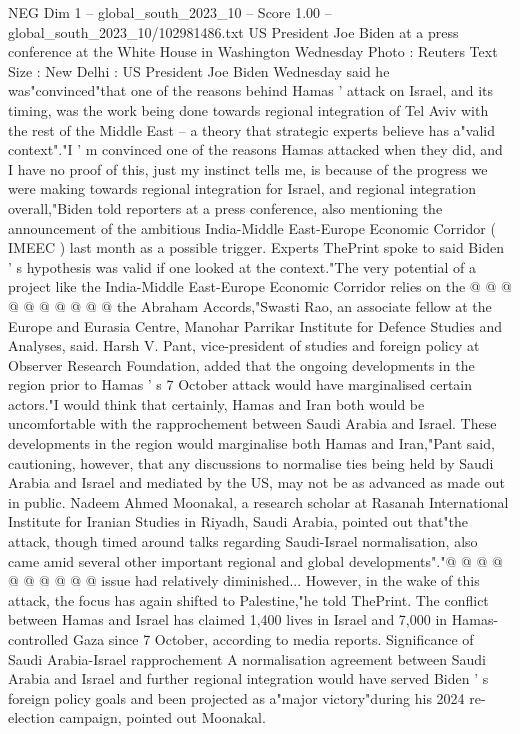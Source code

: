 \begin{textsample}{NEG Dim 1 – global\_south\_2023\_10 – Score 1.00 – global\_south\_2023\_10/102981486.txt}  \label{ex:f1_neg_261}
US President Joe Biden at a press conference at the White House in Washington Wednesday Photo : Reuters Text Size : New Delhi : US President Joe Biden Wednesday said he was"convinced"that one of the reasons behind Hamas ' attack on Israel, and its timing, was the work being done towards regional integration of Tel Aviv with the rest of the Middle East -- a theory that strategic experts believe has a"valid context"."I ' m convinced one of the reasons Hamas attacked when they did, and I have no proof of this, just my instinct tells me, is because of the progress we were making towards regional integration for Israel, and regional integration overall,"Biden told reporters at a press conference, also mentioning the announcement of the ambitious India-Middle East-Europe Economic Corridor ( IMEEC ) last month as a possible trigger.
Experts ThePrint spoke to said Biden ' s hypothesis was valid if one looked at the context."The very potential of a project like the India-Middle East-Europe Economic Corridor relies on the @ @ @ @ @ @ @ @ @ @ the Abraham Accords,"Swasti Rao, an associate fellow at the Europe and Eurasia Centre, Manohar Parrikar Institute for Defence Studies and Analyses, said.
Harsh V.
Pant, vice-president of studies and foreign policy at Observer Research Foundation, added that the ongoing developments in the region prior to Hamas ' s 7 October attack would have marginalised certain actors."I would think that certainly, Hamas and Iran both would be uncomfortable with the rapprochement between Saudi Arabia and Israel.
These developments in the region would marginalise both Hamas and Iran,"Pant said, cautioning, however, that any discussions to normalise ties being held by Saudi Arabia and Israel and mediated by the US, may not be as advanced as made out in public.
Nadeem Ahmed Moonakal, a research scholar at Rasanah International Institute for Iranian Studies in Riyadh, Saudi Arabia, pointed out that"the attack, though timed around talks regarding Saudi-Israel normalisation, also came amid several other important regional and global developments"."@ @ @ @ @ @ @ @ @ @ issue had relatively diminished...
However, in the wake of this attack, the focus has again shifted to Palestine,"he told ThePrint.
The conflict between Hamas and Israel has claimed 1,400 lives in Israel and 7,000 in Hamas-controlled Gaza since 7 October, according to media reports.
Significance of Saudi Arabia-Israel rapprochement A normalisation agreement between Saudi Arabia and Israel and further regional integration would have served Biden ' s foreign policy goals and been projected as a"major victory"during his 2024 re-election campaign, pointed out Moonakal.

\end{textsample}
